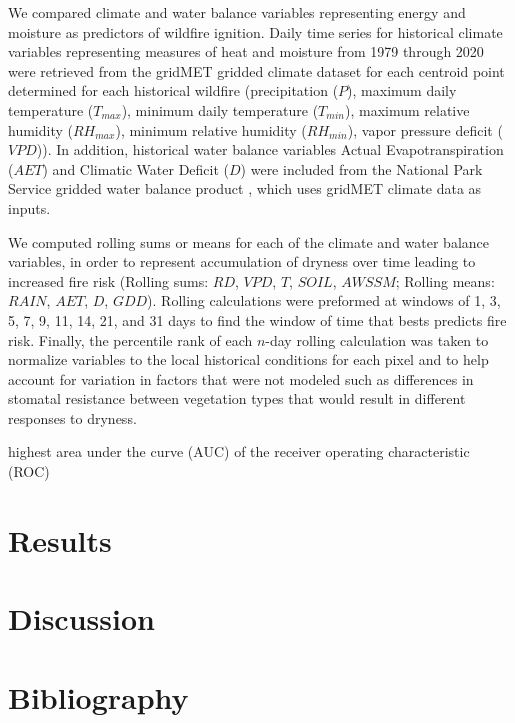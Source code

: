 \documentclass{article}
\begin{document}
We compared climate and water balance variables representing energy and moisture as predictors of wildfire ignition.  Daily time series for historical climate variables representing measures of heat and moisture from 1979 through 2020 were retrieved from the gridMET gridded climate dataset \citep{abatzoglouDevelopmentGriddedSurface2013} for each centroid point determined for each historical wildfire (precipitation ($P$), maximum daily temperature ($T_{max}$), minimum daily temperature ($T_{min}$), maximum relative humidity ($RH_{max}$), minimum relative humidity ($RH_{min}$), vapor pressure deficit ($VPD$)).  In addition, historical water balance variables Actual Evapotranspiration ($AET$) and Climatic Water Deficit ($D$) were included from the National Park Service gridded water balance product \citep{tercekHistoricalChangesPlant2021}, which uses gridMET climate data as inputs.

We computed rolling sums or means for each of the climate and water balance variables, in order to represent accumulation of dryness over time leading to increased fire risk (Rolling sums: $RD$, $VPD$, $T$, $SOIL$, $AWSSM$; Rolling means: $RAIN$, $AET$, $D$, $GDD$).  Rolling calculations were preformed at windows of 1, 3, 5, 7, 9, 11, 14, 21, and 31 days to find the window of time that bests predicts fire risk.  Finally, the percentile rank of each $n$-day rolling calculation was taken to normalize variables to the local historical conditions for each pixel and to help account for variation in factors that were not modeled such as differences in stomatal resistance between vegetation types that would result in different responses to dryness.

 highest area under the curve (AUC) of the receiver operating characteristic (ROC) 

\section{Results}

\section{Discussion}

\section{Bibliography}
\printbibliography
\end{document}

